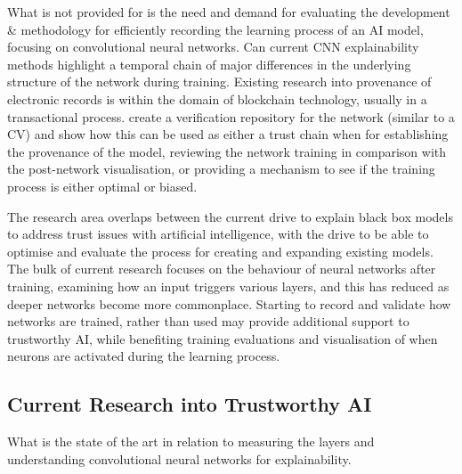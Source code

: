What is not provided for is the need and demand for evaluating the development \& methodology for efficiently recording the learning process of an AI model, focusing on convolutional neural networks. Can current CNN explainability methods highlight a temporal chain of major differences in the underlying structure of the network during training. Existing research into provenance of electronic records is within the domain of blockchain technology, usually in a transactional process\cite{kim_toward_2018}. create a verification repository for the network (similar to a CV) and show how this can be used as either a trust chain when for establishing the provenance of the model, reviewing the network training in comparison with the post-network visualisation, or providing a mechanism to see if the training process is either optimal or biased.

The research area overlaps between the current drive to explain black box models to address trust issues with artificial intelligence, with the drive to be able to optimise and evaluate the process for creating and expanding existing models. The bulk of current research focuses on the behaviour of neural networks after training, examining how an input triggers various layers, and this has reduced as deeper networks become more commonplace. Starting to record and validate how networks are trained, rather than used may provide additional support to trustworthy AI, while benefiting training evaluations and visualisation of when neurons are activated during the learning process.


\subsection{Current Research into Trustworthy AI}
What is the state of the art in relation to measuring the layers and understanding convolutional neural networks for explainability.


